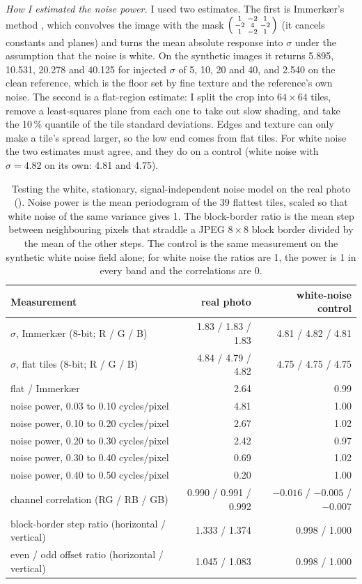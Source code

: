\emph{How I estimated the noise power.} I used two estimates. The first is
Immerkær's method \cite{immerkaer}, which convolves the image with the mask
$\begin{psmallmatrix}1&-2&1\\-2&4&-2\\1&-2&1\end{psmallmatrix}$ (it cancels
constants and planes) and turns the mean absolute response into $\sigma$ under
the assumption that the noise is white. On the synthetic images it returns
5.895, 10.531, 20.278 and 40.125 for injected $\sigma$ of 5, 10, 20 and 40, and
2.540 on the clean reference, which is the floor set by fine texture and the
reference's own noise. The second is a flat-region estimate: I split the crop
into $64\times64$ tiles, remove a least-squares plane from each one to take out
slow shading, and take the 10\,\% quantile of the tile standard deviations. Edges
and texture can only make a tile's spread larger, so the low end comes from flat
tiles. For white noise the two estimates must agree, and they do on a control
(white noise with $\sigma=4.82$ on its own: 4.81 and 4.75).

\begin{table}[H]
\centering
\begin{tabular}{lrr}
\toprule
Measurement & real photo & white-noise control\\
\midrule
$\sigma$, Immerkær (8-bit; R / G / B) & 1.83 / 1.83 / 1.83 & 4.81 / 4.82 / 4.81\\
$\sigma$, flat tiles (8-bit; R / G / B) & 4.84 / 4.79 / 4.82 & 4.75 / 4.75 / 4.75\\
flat / Immerkær & 2.64 & 0.99\\
\midrule
noise power, 0.03 to 0.10 cycles/pixel & 4.81 & 1.00\\
noise power, 0.10 to 0.20 cycles/pixel & 2.67 & 1.02\\
noise power, 0.20 to 0.30 cycles/pixel & 2.42 & 0.97\\
noise power, 0.30 to 0.40 cycles/pixel & 0.69 & 1.02\\
noise power, 0.40 to 0.50 cycles/pixel & 0.20 & 1.00\\
\midrule
channel correlation (RG / RB / GB) & 0.990 / 0.991 / 0.992 & $-0.016$ / $-0.005$ / $-0.007$\\
block-border step ratio (horizontal / vertical) & 1.333 / 1.374 & 0.998 / 1.000\\
even / odd offset ratio (horizontal / vertical) & 1.045 / 1.083 & 0.998 / 1.000\\
\bottomrule
\end{tabular}
\caption{Testing the white, stationary, signal-independent noise model on the
real photo (). Noise power is the mean periodogram of the
39 flattest tiles, scaled so that white noise of the same variance gives 1. The
block-border ratio is the mean step between neighbouring pixels that straddle a
JPEG $8\times8$ block border divided by the mean of the other steps. The control
is the same measurement on the synthetic white noise field alone; for white noise
the ratios are 1, the power is 1 in every band and the correlations are 0.}
\label{tab:real-noise}
\end{table}

